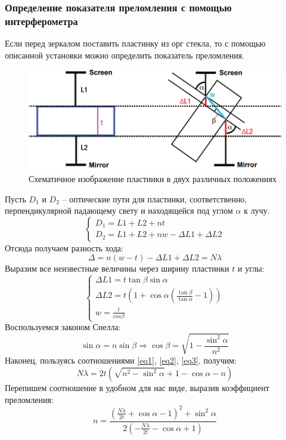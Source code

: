 \documentclass[%
reprint,
russian,
 amsmath,amssymb,
 aps,
]{revtex4-2}
\begin{document}
\subsubsection{\label{sec:level3}Определение показателя преломления с помощью интерферометра}
Если перед зеркалом поставить пластинку из орг стекла, то с помощью описанной установки можно определить показатель преломления.
\begin{figure}[h!]
\includegraphics[width=1\linewidth]{Scheme2.png}%
\caption{\label{fig:epsart}Схематичное изображение пластинки в двух различных положениях}
\end{figure}
Пусть $D_1$ и $D_2$ -- оптические пути для пластинки, соответственно, перпендикулярной падающему свету и находящейся под углом $\alpha$ к лучу.
\begin{equation*}
    \begin{cases}
        D_1 = L1 + L2 + nt\\
        D_2 = L1 + L2 + nw - \Delta L1 + \Delta L2
    \end{cases}
\end{equation*}
Отсюда получаем разность хода:
\begin{equation}
    \label{eq1}
    \Delta = n(w - t) - \Delta L1 + \Delta L2 = N \lambda
\end{equation}
Выразим все неизвестные величины через ширину пластинки $t$ и углы:
\begin{equation}
    \label{eq2}
    \begin{cases}
        \Delta L1 = t \tan{\beta} \sin{\alpha}\\
        \Delta L2 = t (1 + \cos{\alpha}(\frac{\tan{\beta}}{\tan{\alpha}} - 1))\\
        w = \frac{t}{cos{\beta}}
    \end{cases}
\end{equation}
Воспользуемся законом Снелла:
\begin{equation}
    \label{eq3}
    \sin{\alpha} = n \sin{\beta} \Rightarrow \cos{\beta} = \sqrt{1 - \frac{\sin^2{\alpha}}{n^2}}
\end{equation}
Наконец, пользуясь соотношениями \ref{eq1}, \ref{eq2}, \ref{eq3}, получим:
\begin{equation}
    N \lambda = 2 t (\sqrt{n^2 - \sin^2{\alpha}} + 1 - \cos{\alpha} - n)
\end{equation}
Перепишем соотношение в удобном для нас виде, выразив коэффициент преломления:
\begin{equation}
    \label{refraction}
    n = \frac{(\frac{N \lambda}{2t} + \cos{\alpha} - 1)^2 + \sin^2{\alpha}}{2 (-\frac{N \lambda}{2t} - \cos{\alpha} + 1)}
\end{equation}
\end{document}
